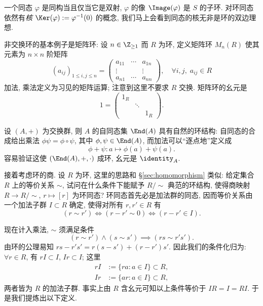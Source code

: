 一个同态 $\varphi$ 是同构当且仅当它是双射, $\varphi$ 的像 $\Image(\varphi)$ 是 $S$ 的子环. 对环同态依然有\emph{核} $\Ker(\varphi) := \varphi^{-1}(0)$ 的概念, 我们马上会看到同态的核无非是环的双边理想.

\begin{example}\label{eg:matrix-ring}
	非交换环的基本例子是矩阵环: 设 $n \in \Z_{\geq 1}$ 而 $R$ 为环, 定义矩阵环 $M_n(R)$ 使其元素为 $n \times n$ 阶矩阵
	\[ (a_{ij})_{1 \leq i,j \leq n} = \begin{pmatrix}
		a_{11} & \cdots & a_{1n} \\
		\vdots & & \vdots \\
		a_{n1} & \cdots & a_{nn}
	\end{pmatrix}, \quad \forall i,j,\; a_{ij} \in R \]
	加法, 乘法定义为习见的矩阵运算; 注意到这里不要求 $R$ 交换. 矩阵环的幺元是
	\[ 1 = \left( \begin{smallmatrix} 1_R & & \\ & \ddots & \\ & & 1_R \end{smallmatrix} \right). \]
\end{example}

\begin{example}\label{eg:End-ring}
	设 $(A, +)$ 为交换群, 则 $A$ 的自同态集 $\End(A)$ 具有自然的环结构: 自同态的合成给出乘法 $\phi \psi = \phi \circ \psi$, 其中 $\phi, \psi \in \End(A)$, 而加法可以``逐点地''定义成
	\[ \phi + \psi: a \longmapsto \phi(a) + \psi(a). \]
	容易验证这使 $(\End(A), +, \cdot)$ 成环, 幺元是 $\identity_A$.
\end{example}

接着考虑环的商. 设 $R$ 为环, 这里的思路和 \S\ref{sec:homomorphism} 类似: 给定集合 $R$ 上的等价关系 $\sim$, 试问在什么条件下能赋予 $R/\sim$ 典范的环结构, 使得商映射 $R \to R/\sim$, $r \mapsto [r]$ 为环同态? 环同态首先必是加法群的同态, 因而等价关系由一个加法子群 $I \subset R$ 确定, 使得对所有 $r, r' \in R$ 有
\[ (r \sim r') \iff (r-r' \sim 0) \iff (r-r' \in I). \]

现在计入乘法, $\sim$ 须满足条件
\[ (r \sim r') \wedge (s \sim s') \implies (rs \sim r's'). \]
由环的公理易知 $rs - r's' = r(s-s') + (r-r')s'$. 因此我们的条件化归为: $\forall r \in R$, 有 $rI \subset I$, $Ir \subset I$; 这里
\begin{align*}
	rI & := \{ra : a \in I\} \subset R, \\
	Ir & := \{ar : a \in I\} \subset R,
\end{align*}
两者皆为 $R$ 的加法子群. 事实上由 $R$ 含幺元可知以上条件等价于 $IR = I = RI$. 于是我们提炼出以下定义.

